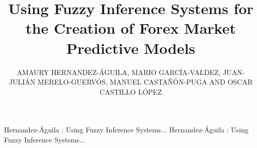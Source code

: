 \documentclass{ieeeaccess}
\begin{document}

\title{Using Fuzzy Inference Systems for the Creation of Forex Market Predictive Models}
\author{
    \uppercase{Amaury Hernandez-\'{A}guila,
    Mario Garc\'{i}a-Valdez,
    Juan-Julián Merelo-Guerv\'{o}s,
    Manuel Castañ\'{o}n-Puga and
    Oscar Castillo L\'{o}pez}}

\address[1]{National Technological Institute of Mexico, Calzada Del Tecnoló\'{o}ico s/n, Fraccionamiento Tomas Aquino, Tijuana, BC 22414 México (e-mail: {amerhag,mario,ocastillo}@tectijuana.edu.mx)}
\address[2]{University of Granada, Campus Aynadamar Daniel Saucedo Aranda s/n, Granada 18071, 80523 Spain (e-mail: jmerelo@geneura.ugr.es)}
\address[3]{Autonomous University of Baja California, Calzada Universidad 14418, Tijuana, BC, 22390, México (e-mail: puga@uabc.edu.mx)}

\markboth
{Hernandez-\'{A}guila \headeretal: Using Fuzzy Inference Systems... }
{Hernandez-\'{A}guila \headeretal: Using Fuzzy Inference Systems... }

\end{document}
